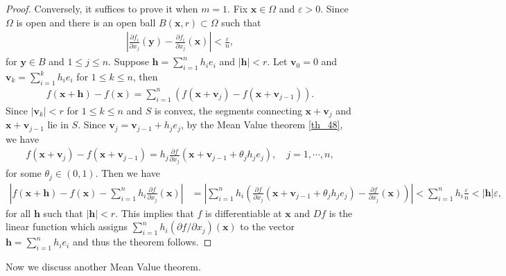 \documentclass[11pt]{book}
\theoremstyle{definition}
\numberwithin{equation}{chapter}
\begin{document}
\begin{proof}
Conversely, it suffices to prove it when $m = 1$. Fix $\mathbf{x} \in \Omega$ and $\varepsilon > 0$. Since $\Omega$ is open and there is an open ball $B(\mathbf{x}, r) \subset \Omega$ such that
\begin{align*}
    \left|\frac{\partial f_i}{\partial x_j}(\mathbf{y}) - \frac{\partial f_i}{\partial x_j}(\mathbf{x})\right| < \frac{\varepsilon}{n},
\end{align*}
for $\mathbf{y} \in B$ and $1 \leq j \leq n$. Suppose $\mathbf{h} = \sum^n_{i=1} h_i e_i$ and $\left|\mathbf{h}\right| < r$. Let $\mathbf{v}_0 = 0$ and $\mathbf{v}_k = \sum^k_{i=1} h_i e_i$ for $1 \leq k \leq n$, then
\begin{align*}
    f(\mathbf{x} + \mathbf{h}) - f(\mathbf{x}) = \sum^n_{i=1} \left(f(\mathbf{x} + \mathbf{v}_j) - f(\mathbf{x} + \mathbf{v}_{j-1})\right).
\end{align*}
Since $\left|\mathbf{v}_k\right| < r$ for $1 \leq k \leq n$ and $S$ is convex, the segments connecting $\mathbf{x} + \mathbf{v}_j$ and $\mathbf{x} + \mathbf{v}_{j-1}$ lie in $S$. Since $\mathbf{v}_j = \mathbf{v}_{j-1} + h_j e_j$, by the Mean Value theorem \ref{th_48}, we have
\begin{align*}
    f(\mathbf{x} + \mathbf{v}_j) - f(\mathbf{x} + \mathbf{v}_{j-1}) = h_j\frac{\partial f}{\partial x_j}(\mathbf{x} + \mathbf{v}_{j-1} + \theta_j h_j e_j), \quad j = 1,\cdots,n,
\end{align*}
for some $\theta_j \in (0,1)$. Then we have
\begin{align*}
    \left|f(\mathbf{x} + \mathbf{h}) - f(\mathbf{x}) - \sum^n_{i=1} h_i \frac{\partial f}{\partial x_j}(\mathbf{x}) \right| & = \left|\sum^n_{i=1} h_i \left( \frac{\partial f}{\partial x_j}(\mathbf{x} + \mathbf{v}_{j-1} + \theta_j h_j e_j) - \frac{\partial f}{\partial x_j}(\mathbf{x}) \right) \right| < \sum^n_{i=1} h_i \frac{\varepsilon}{n} < \left|\mathbf{h}\right| \varepsilon,
\end{align*}
for all $\mathbf{h}$ such that $\left|\mathbf{h}\right| < r$. This implies that $f$ is differentiable at $\mathbf{x}$ and $Df$ is the linear function which assigns $\sum^n_{i=1} h_i (\partial f/\partial x_j)(\mathbf{x})$ to the vector $\mathbf{h} = \sum^n_{i=1} h_i e_i$ and thus the theorem follows.
\end{proof}

\medskip

Now we discuss another Mean Value theorem.

\medskip
\end{document}
